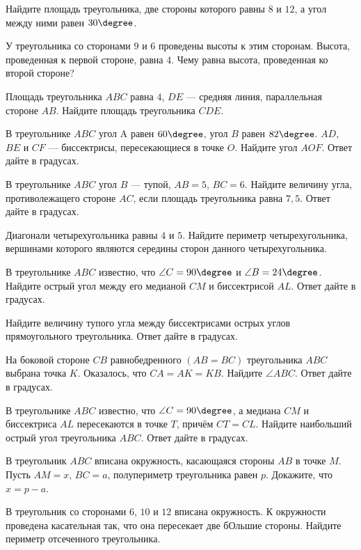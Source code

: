 
\begin{class}[number=4]
	\begin{listofex}
		\item Найдите площадь треугольника, две стороны которого равны \( 8 \) и \( 12 \), а угол между ними равен \( 30\degree \).
		\item У треугольника со сторонами \( 9 \) и \( 6 \) проведены высоты к этим сторонам. Высота, проведенная к первой стороне, равна \( 4 \). Чему равна высота, проведенная ко второй стороне?
		\item Площадь треугольника \( ABC \) равна \( 4 \), \( DE \) --- средняя линия, параллельная стороне \( AB \). Найдите площадь треугольника \( CDE \).
		\item В треугольнике \( ABC \) угол A равен \( 60\degree \), угол \( B \) равен \( 82\degree \). \( AD \), \( BE \) и \( CF \) --- биссектрисы, пересекающиеся в точке \( O \). Найдите угол \( AOF \). Ответ дайте в градусах.
		\item В треугольнике \( ABC \) угол \( B \) --- тупой, \( AB =5 \), \( BC = 6 \). Найдите величину угла, противолежащего стороне \( AC \), если площадь треугольника равна \( 7,5 \). Ответ дайте в градусах.
		\item Диагонали четырехугольника равны \( 4 \) и \( 5 \). Найдите периметр четырехугольника, вершинами которого являются середины сторон данного четырехугольника.
		\item В треугольнике \( ABC \) известно, что \( \angle C =90\degree \) и \( \angle B=24\degree \). Найдите острый угол между его медианой \( CM \) и биссектрисой \( AL \). Ответ дайте в градусах.
		\item Найдите величину тупого угла между биссектрисами острых углов прямоугольного треугольника. Ответ дайте в градусах.
		\item На боковой стороне \( CB \) равнобедренного \( (AB=BC) \) треугольника
		\( ABC \) выбрана точка \( K \). Оказалось, что \( CA = AK = KB \). Найдите \( \angle ABC \). Ответ дайте в градусах.
		\item В треугольнике \( ABC \) известно, что \( \angle C =90\degree \), а медиана \( CM \) и биссектриса \( AL \) пересекаются в точке \( T \), причём \( CT = CL \).
		Найдите наибольший острый угол треугольника \( ABC \). Ответ
		дайте в градусах.
		\item В треугольник \( ABC \) вписана окружность, касающаяся стороны \( AB \) в точке \( M \). Пусть \( AM = x \), \( BC = a \), полупериметр треугольника равен \( p \). Докажите, что \( x = p - a \).
		\item В треугольник со сторонами \( 6 \), \( 10 \) и \( 12 \) вписана окружность. К окружности проведена касательная так, что
		она пересекает две бОльшие стороны. Найдите периметр отсеченного треугольника.
	\end{listofex}
\end{class}

